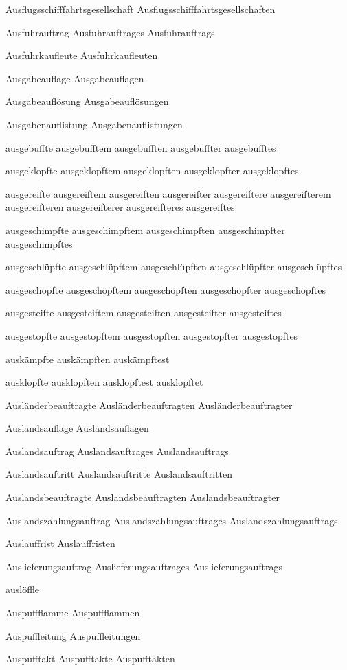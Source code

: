 Ausflugsschifffahrtsgesellschaft
Ausflugsschifffahrtsgesellschaften

Ausfuhrauftrag
Ausfuhrauftrages
Ausfuhrauftrags

Ausfuhrkaufleute
Ausfuhrkaufleuten

Ausgabeauflage
Ausgabeauflagen

Ausgabeauflösung
Ausgabeauflösungen

Ausgabenauflistung
Ausgabenauflistungen

ausgebuffte
ausgebufftem
ausgebufften
ausgebuffter
ausgebufftes

ausgeklopfte
ausgeklopftem
ausgeklopften
ausgeklopfter
ausgeklopftes

ausgereifte
ausgereiftem
ausgereiften
ausgereifter
ausgereiftere
ausgereifterem
ausgereifteren
ausgereifterer
ausgereifteres
ausgereiftes

ausgeschimpfte
ausgeschimpftem
ausgeschimpften
ausgeschimpfter
ausgeschimpftes

ausgeschlüpfte
ausgeschlüpftem
ausgeschlüpften
ausgeschlüpfter
ausgeschlüpftes

ausgeschöpfte
ausgeschöpftem
ausgeschöpften
ausgeschöpfter
ausgeschöpftes

ausgesteifte
ausgesteiftem
ausgesteiften
ausgesteifter
ausgesteiftes

ausgestopfte
ausgestopftem
ausgestopften
ausgestopfter
ausgestopftes

auskämpfte
auskämpften
auskämpftest

ausklopfte
ausklopften
ausklopftest
ausklopftet

Ausländerbeauftragte
Ausländerbeauftragten
Ausländerbeauftragter

Auslandsauflage
Auslandsauflagen

Auslandsauftrag
Auslandsauftrages
Auslandsauftrags

Auslandsauftritt
Auslandsauftritte
Auslandsauftritten

Auslandsbeauftragte
Auslandsbeauftragten
Auslandsbeauftragter

Auslandszahlungsauftrag
Auslandszahlungsauftrages
Auslandszahlungsauftrags

Auslauffrist
Auslauffristen

Auslieferungsauftrag
Auslieferungsauftrages
Auslieferungsauftrags

auslöffle

Auspuffflamme
Auspuffflammen

Auspuffleitung
Auspuffleitungen

Auspufftakt
Auspufftakte
Auspufftakten

